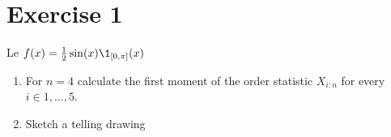 \section*{Exercise 1}

Le $f(x) = \frac{1}{2}\sin(x) \1_{[0,\pi]}(x)$
\begin{enumerate}
    \item For $n = 4$ calculate the first moment of the order statistic $X_{i:n}$ for every $i \in 1,\ldots, 5$.
    \item Sketch a telling drawing
\end{enumerate}